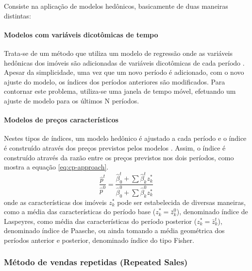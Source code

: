 \documentclass[
	12pt,				%
	oneside,			%
	a4paper,			%
	chapter=TITLE,		%
	section=TITLE,		%
	english,			%
	brazil				%
	]{abntex2}
\begin{document}
Consiste na aplicação de modelos hedônicos, basicamente de duas maneiras distintas:

\hypertarget{modelos-com-variuxe1veis-dicotuxf4micas-de-tempo}{%
\paragraph{Modelos com variáveis dicotômicas de tempo}\label{modelos-com-variuxe1veis-dicotuxf4micas-de-tempo}}

Trata-se de um método que utiliza um modelo de regressão onde as variáveis
hedônicas dos imóveis são adicionadas de variáveis dicotômicas de cada período
\autocite[158]{rppi}. Apesar da simplicidade, uma vez que um novo período é adicionado,
com o novo ajuste do modelo, os índices dos períodos anteriores são modificados.
Para contornar este problema, utiliza-se uma janela de tempo móvel, efetuando um
ajuste de modelo para os últimos N períodos.

\hypertarget{modelos-de-preuxe7os-caracteruxedsticos}{%
\paragraph{Modelos de preços característicos}\label{modelos-de-preuxe7os-caracteruxedsticos}}

Nestes tipos de índices, um modelo hedônico é ajustado a cada período e o índice
é construído através dos preços previstos pelos modelos \autocite[53]{rppi}. Assim, o
índice é construído através da razão entre os preços previstos nos dois
períodos, como mostra a equação \eqref{eq:cp-approach}.
\begin{equation}
\frac{\hat p^t}{\hat p^0} = \frac{\hat \beta_0^t + \sum \hat \beta_k^t z_k^*}{\hat \beta_0^0 + \sum \hat \beta_k^0 z_k^*}
\label{eq:cp-approach}
\end{equation}
onde as características dos imóveis \(z_k^*\) pode ser estabelecida de diversas
maneiras, como a média das características do período base (\(z_k^* = \bar z_k^0\)),
denominado índice de Laspeyres, como média das características do período
posterior (\(z_k^* = \bar z_k^t\)), denominado índice de Paasche, ou ainda tomando
a média geométrica dos períodos anterior e posterior, denominado índice do tipo
Fisher.

\hypertarget{muxe9todo-de-vendas-repetidas-repeated-sales}{%
\subsubsection{Método de vendas repetidas (Repeated Sales)}\label{muxe9todo-de-vendas-repetidas-repeated-sales}}
\end{document}
